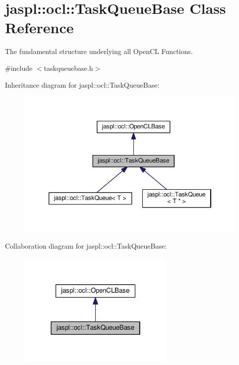 \hypertarget{classjaspl_1_1ocl_1_1_task_queue_base}{}\section{jaspl\+:\+:ocl\+:\+:Task\+Queue\+Base Class Reference}
\label{classjaspl_1_1ocl_1_1_task_queue_base}


The fundamental structure underlying all Open\+CL Functions.  




{\ttfamily \#include $<$taskqueuebase.\+h$>$}



Inheritance diagram for jaspl\+:\+:ocl\+:\+:Task\+Queue\+Base\+:\nopagebreak
\begin{figure}[H]
\begin{center}
\leavevmode
\includegraphics[width=346pt]{classjaspl_1_1ocl_1_1_task_queue_base__inherit__graph}
\end{center}
\end{figure}


Collaboration diagram for jaspl\+:\+:ocl\+:\+:Task\+Queue\+Base\+:\nopagebreak
\begin{figure}[H]
\begin{center}
\leavevmode
\includegraphics[width=214pt]{classjaspl_1_1ocl_1_1_task_queue_base__coll__graph}
\end{center}
\end{figure}
